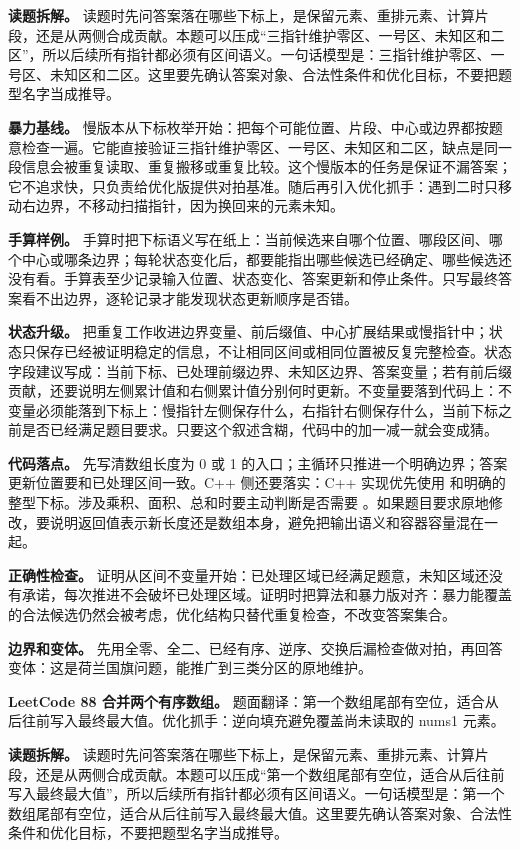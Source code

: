\textbf{读题拆解。} 读题时先问答案落在哪些下标上，是保留元素、重排元素、计算片段，还是从两侧合成贡献。本题可以压成“三指针维护零区、一号区、未知区和二区”，所以后续所有指针都必须有区间语义。一句话模型是：三指针维护零区、一号区、未知区和二区。这里要先确认答案对象、合法性条件和优化目标，不要把题型名字当成推导。

\textbf{暴力基线。} 慢版本从下标枚举开始：把每个可能位置、片段、中心或边界都按题意检查一遍。它能直接验证三指针维护零区、一号区、未知区和二区，缺点是同一段信息会被重复读取、重复搬移或重复比较。这个慢版本的任务是保证不漏答案；它不追求快，只负责给优化版提供对拍基准。随后再引入优化抓手：遇到二时只移动右边界，不移动扫描指针，因为换回来的元素未知。

\textbf{手算样例。} 手算时把下标语义写在纸上：当前候选来自哪个位置、哪段区间、哪个中心或哪条边界；每轮状态变化后，都要能指出哪些候选已经确定、哪些候选还没有看。手算表至少记录输入位置、状态变化、答案更新和停止条件。只写最终答案看不出边界，逐轮记录才能发现状态更新顺序是否错。

\textbf{状态升级。} 把重复工作收进边界变量、前后缀值、中心扩展结果或慢指针中；状态只保存已经被证明稳定的信息，不让相同区间或相同位置被反复完整检查。状态字段建议写成：当前下标、已处理前缀边界、未知区边界、答案变量；若有前后缀贡献，还要说明左侧累计值和右侧累计值分别何时更新。不变量要落到代码上：不变量必须能落到下标上：慢指针左侧保存什么，右指针右侧保存什么，当前下标之前是否已经满足题目要求。只要这个叙述含糊，代码中的加一减一就会变成猜。

\textbf{代码落点。} 先写清数组长度为 0 或 1 的入口；主循环只推进一个明确边界；答案更新位置要和已处理区间一致。C++ 侧还要落实：C++ 实现优先使用  和明确的整型下标。涉及乘积、面积、总和时要主动判断是否需要 。如果题目要求原地修改，要说明返回值表示新长度还是数组本身，避免把输出语义和容器容量混在一起。

\textbf{正确性检查。} 证明从区间不变量开始：已处理区域已经满足题意，未知区域还没有承诺，每次推进不会破坏已处理区域。证明时把算法和暴力版对齐：暴力能覆盖的合法候选仍然会被考虑，优化结构只替代重复检查，不改变答案集合。

\textbf{边界和变体。} 先用全零、全二、已经有序、逆序、交换后漏检查做对拍，再回答变体：这是荷兰国旗问题，能推广到三类分区的原地维护。

\noindent\textbf{LeetCode 88 合并两个有序数组。} 题面翻译：第一个数组尾部有空位，适合从后往前写入最终最大值。优化抓手：逆向填充避免覆盖尚未读取的 nums1 元素。

\textbf{读题拆解。} 读题时先问答案落在哪些下标上，是保留元素、重排元素、计算片段，还是从两侧合成贡献。本题可以压成“第一个数组尾部有空位，适合从后往前写入最终最大值”，所以后续所有指针都必须有区间语义。一句话模型是：第一个数组尾部有空位，适合从后往前写入最终最大值。这里要先确认答案对象、合法性条件和优化目标，不要把题型名字当成推导。

